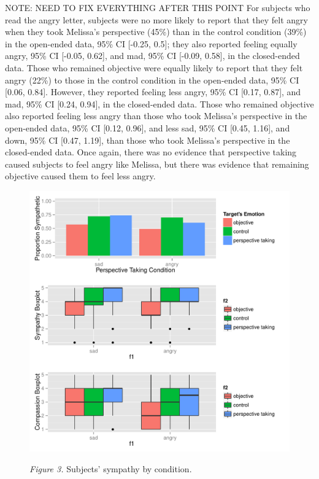 \documentclass[man,a4paper,noextraspace,apacite]{apa6}\usepackage[]{graphicx}\usepackage[]{color}
\makeatletter
\def\maxwidth{ %
  \ifdim\Gin@nat@width>\linewidth
    \linewidth
  \else
    \Gin@nat@width
  \fi
}
\newenvironment{kframe}{%
 \def\at@end@of@kframe{}%
 \ifinner\ifhmode%
  \def\at@end@of@kframe{\end{minipage}}%
  \begin{minipage}{\columnwidth}%
 \fi\fi%
 \def\FrameCommand##1{\hskip\@totalleftmargin \hskip-\fboxsep
 \colorbox{shadecolor}{##1}\hskip-\fboxsep
     \hskip-\linewidth \hskip-\@totalleftmargin \hskip\columnwidth}%
 \MakeFramed {\advance\hsize-\width
   \@totalleftmargin\z@ \linewidth\hsize
   \@setminipage}}%
 {\par\unskip\endMakeFramed%
 \at@end@of@kframe}
\newenvironment{knitrout}{}{} %
\makeatother
\begin{document}
NOTE: NEED TO FIX EVERYTHING AFTER THIS POINT
    For subjects who read the angry letter, subjects were no more likely to report that they felt angry when they took Melissa's perspective (45\%) than in the control condition (39\%) in the open-ended data, 95\% CI [-0.25, 0.5]; they also reported feeling equally angry, 95\% CI [-0.05, 0.62], and mad, 95\% CI [-0.09, 0.58], in the closed-ended data. Those who remained objective were equally likely to report that they felt angry (22\%) to those in the control condition in the open-ended data, 95\% CI [0.06, 0.84]. However, they reported feeling less angry, 95\% CI [0.17, 0.87], and mad, 95\% CI [0.24, 0.94], in the closed-ended data. Those who remained objective also reported feeling less angry than those who took Melissa's perspective in the open-ended data, 95\% CI [0.12, 0.96], and less sad, 95\% CI [0.45, 1.16], and down, 95\% CI [0.47, 1.19], than those who took Melissa's perspective in the closed-ended data.
    Once again, there was no evidence that perspective taking caused subjects to feel angry like Melissa, but there was evidence that remaining objective caused them to feel less angry.
    
\begin{figure}
\begin{knitrout}
\color{fgcolor}\begin{kframe}


{\ttfamily\noindent\color{warningcolor}{\#\# Warning: Removed 2 rows containing non-finite values (stat\_boxplot).}}\end{kframe}
\includegraphics[width=\maxwidth]{figure/SympPlot} 

\end{knitrout}
\textit{Figure 3.} Subjects' sympathy by condition.
\end{figure}




\end{document}
